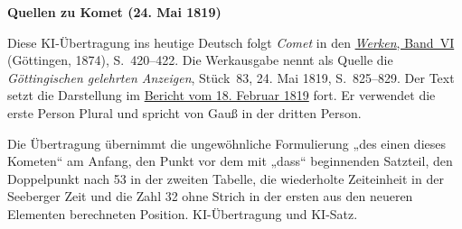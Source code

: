 \clearpage\thispagestyle{empty}
\begin{center}\textbf{Quellen zu Komet (24. Mai 1819)}\end{center}
\noindent Diese KI-Übertragung ins heutige Deutsch folgt \textit{Comet} in den \href{https://gdz.sub.uni-goettingen.de/id/PPN236007467}{\textit{Werken}, Band~VI} (Göttingen, 1874), S.~420--422. Die Werkausgabe nennt als Quelle die \textit{Göttingischen gelehrten Anzeigen}, Stück~83, 24. Mai 1819, S.~825--829. Der Text setzt die Darstellung im \hyperlink{native-422}{Bericht vom 18. Februar 1819} fort. Er verwendet die erste Person Plural und spricht von Gauß in der dritten Person.
\par\smallskip\noindent Die Übertragung übernimmt die ungewöhnliche Formulierung „des einen dieses Kometen“ am Anfang, den Punkt vor dem mit „dass“ beginnenden Satzteil, den Doppelpunkt nach 53 in der zweiten Tabelle, die wiederholte Zeiteinheit in der Seeberger Zeit und die Zahl 32 ohne Strich in der ersten aus den neueren Elementen berechneten Position. KI-Übertragung und KI-Satz.
\clearpage
